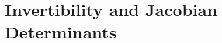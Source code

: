 \documentclass[lettersize,journal]{IEEEtran}
\begin{document}
\section{Invertibility and Jacobian Determinants}
\label{sec:background}

\end{document}
